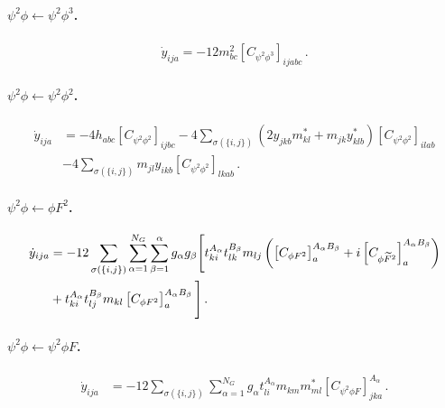 \paragraph{\texorpdfstring{$\psi^2 \phi \leftarrow \psi^2 \phi^3$}{yukfrompsi2phi3}.}

\begin{align}
    \dot y_{ija} = -12m^2_{bc}\left[ C_{\psi^2\phi^3}\right]_{ijabc}\,.\label{yuk_psi2phi3}
\end{align}

\paragraph{\texorpdfstring{$\psi^2 \phi \leftarrow \psi^2 \phi^2$}{yukfrompsi2phi2}.}

\begin{align}
    \dot y_{ija} &= -4h_{abc}\left[ C_{\psi^2\phi^2}\right]_{ijbc} -4\sum_{\sigma(\{i,j\})}\left(2y_{jkb}m^*_{kl}+m_{jk}y^*_{klb}\right)\left[ C_{\psi^2\phi^2}\right]_{ilab} \nonumber \\
    &-4\sum_{\sigma(\{i,j\})} m_{jl} y_{ikb} \left[C_{\psi^2\phi^2}\right]_{lkab}\,.\label{yuk_psi2phi2}
\end{align}

\paragraph{\texorpdfstring{$\psi^2 \phi \leftarrow \phi F^2$.}{yukfromphiF2}}

\begin{align}
    \dot y_{ija} &= -12\sum_{\sigma(\{i,j\})} \sum_{\alpha=1}^{N_G}\sum_{\beta=1}^{\alpha} g_\alpha g_\beta\Bigg[ t^{A_\alpha}_{ki} t^{B_\beta}_{lk} m_{lj} \left(\left[C_{\phi F^2}\right]_{a}^{A_\alpha B_\beta}+i\left[C_{\phi \widetilde{F}^2}\right]_{a}^{A_\alpha B_\beta} \right)\nonumber\\
    &+t_{ki}^{A_\alpha} t_{lj}^{B_\beta} m_{kl}\left[C_{\phi F^2}\right]^{A_\alpha B_\beta}_a\Bigg]\,.
    \label{yuk_phiF2}
\end{align}

\paragraph{\texorpdfstring{$\psi^2 \phi \leftarrow \psi^2 \phi F$.}{yukfromphi2phiF}}

\begin{align}
    \dot y_{ija} &= -12\sum_{\sigma(\{i,j\})} \sum_{\alpha=1}^{N_G} g_\alpha t^{A_\alpha}_{li}m_{km}^{\phantom *} m^*_{ml} \left[C_{\psi^2\phi F}\right]_{jka}^{A_\alpha}\,.\label{yuk_psi2phiF}
\end{align}


